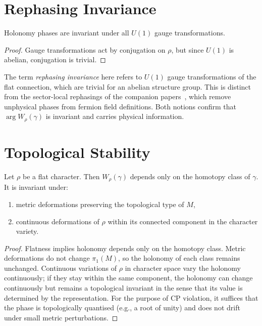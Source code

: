 \documentclass[12pt]{article}
\begin{document}
\section{Rephasing Invariance}
\label{prop:rephasing}

\begin{proposition}
Holonomy phases are invariant under all $U(1)$ gauge transformations.
\end{proposition}

\begin{proof}
Gauge transformations act by conjugation on $\rho$,
but since $U(1)$ is abelian, conjugation is trivial.
\end{proof}

\begin{remark}
The term \emph{rephasing invariance} here refers to $U(1)$ gauge
transformations of the flat connection, which are trivial for an abelian
structure group.  This is distinct from the sector-local rephasings
of the companion papers~\cite{Gentry:CKM,Gentry:PMNS}, which remove
unphysical phases from fermion field definitions.  Both notions confirm
that $\arg W_\rho(\gamma)$ is invariant and carries physical information.
\end{remark}

\section{Topological Stability}

\begin{theorem}
Let $\rho$ be a flat character.
Then $W_\rho(\gamma)$ depends only on the homotopy class of $\gamma$.
It is invariant under:
\begin{enumerate}
\item metric deformations preserving the topological type of $M$,
\item continuous deformations of $\rho$ within its connected component
in the character variety.
\end{enumerate}
\end{theorem}

\begin{proof}
Flatness implies holonomy depends only on the homotopy class.
Metric deformations do not change $\pi_1(M)$, so the holonomy of each class
remains unchanged.  Continuous variations of $\rho$ in character space
vary the holonomy continuously; if they stay within the same component,
the holonomy can change continuously but remains a topological invariant
in the sense that its value is determined by the representation.
For the purpose of CP violation, it suffices that the phase is
topologically quantised (e.g., a root of unity) and does not drift
under small metric perturbations.
\end{proof}
\end{document}
